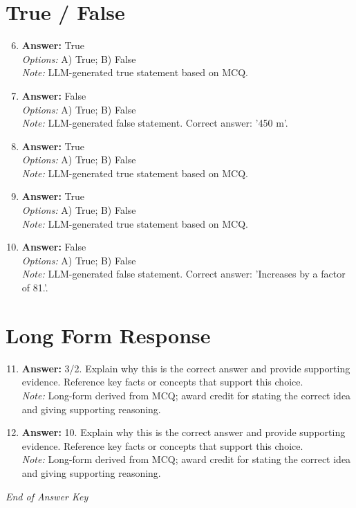 \documentclass[12pt]{article}
\begin{document}
\section*{True / False}
\begin{enumerate}[label=\arabic*.]
\setcounter{enumi}{5}
\item \textbf{Answer:} True
\\ \textit{Options:} A) True; B) False
\\ \textit{Note:} LLM-generated true statement based on MCQ.
\item \textbf{Answer:} False
\\ \textit{Options:} A) True; B) False
\\ \textit{Note:} LLM-generated false statement. Correct answer: '450 m'.
\item \textbf{Answer:} True
\\ \textit{Options:} A) True; B) False
\\ \textit{Note:} LLM-generated true statement based on MCQ.
\item \textbf{Answer:} True
\\ \textit{Options:} A) True; B) False
\\ \textit{Note:} LLM-generated true statement based on MCQ.
\item \textbf{Answer:} False
\\ \textit{Options:} A) True; B) False
\\ \textit{Note:} LLM-generated false statement. Correct answer: 'Increases by a factor of 81.'.
\end{enumerate}

\section*{Long Form Response}
\begin{enumerate}[label=\arabic*.]
\setcounter{enumi}{10}
\item \textbf{Answer:} 3/2. Explain why this is the correct answer and provide supporting evidence. Reference key facts or concepts that support this choice.
\\ \textit{Note:} Long-form derived from MCQ; award credit for stating the correct idea and giving supporting reasoning.
\item \textbf{Answer:} 10. Explain why this is the correct answer and provide supporting evidence. Reference key facts or concepts that support this choice.
\\ \textit{Note:} Long-form derived from MCQ; award credit for stating the correct idea and giving supporting reasoning.
\end{enumerate}

\vfill
\noindent\textit{End of Answer Key}
\end{document}
